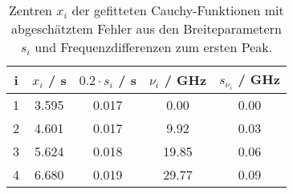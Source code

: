 \begin{table}[H]
\caption{Zentren $x_i$ der gefitteten Cauchy-Funktionen mit abgeschätztem Fehler aus den Breiteparametern $s_i$ und Frequenzdifferenzen zum ersten Peak. }
\begin{center}
\begin{tabular}{|c|c|c|c|c|}
  \hline
  i & $x_i$ / s & $0.2 \cdot s_i$ / s & $\nu_i$ / GHz & $s_{\nu_i}$ / GHz \\ \hline
  1 & 3.595 & 0.017 & 0.00 & 0.00 \\ \hline
  2 & 4.601 & 0.017 & 9.92 & 0.03 \\ \hline
  3 & 5.624 & 0.018 & 19.85 & 0.06 \\ \hline
  4 & 6.680 & 0.019 & 29.77 & 0.09 \\ \hline
\end{tabular}
\end{center}
\label{tab:etalon:calib:down}
\end{table}
